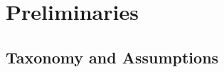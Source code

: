 




\vspace{-5mm}

\section{Preliminaries} \label{preliminaries}


%

\vspace{-1mm}

\subsection{Taxonomy and Assumptions}\label{Notations-and-Assumptions}
\vspace{-1mm}



